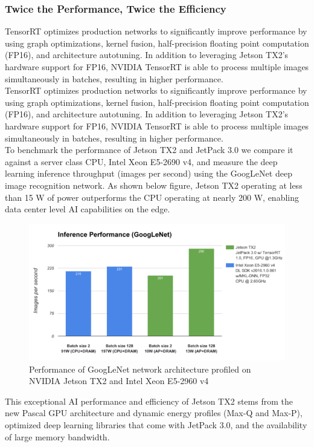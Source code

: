         \subsubsection{Twice the Performance, Twice the Efficiency}
            TensorRT optimizes production networks to significantly improve performance by using graph optimizations, kernel fusion, half-precision floating point computation (FP16), and architecture autotuning. In addition to leveraging Jetson TX2’s hardware support for FP16, 
            NVIDIA TensorRT is able to process multiple images simultaneously in batches, resulting in higher performance. \\ 
            \vspace{3mm}
            TensorRT optimizes production networks to significantly improve performance by using graph optimizations, kernel fusion, half-precision floating point computation (FP16), and architecture autotuning. In addition to leveraging Jetson TX2’s hardware support for FP16, 
            NVIDIA TensorRT is able to process multiple images simultaneously in batches, resulting in higher performance. \\ 
            \vspace{3mm}
            To benchmark the performance of Jetson TX2 and JetPack 3.0 we compare it against a server class CPU, Intel Xeon E5-2690 v4, and measure the deep learning inference throughput (images per second) using the GoogLeNet deep image recognition network. As shown below figure, 
            Jetson TX2 operating at less than 15 W of power outperforms the CPU operating at nearly 200 W, enabling data center level AI capabilities on the edge.
            \begin{figure}[H]
                \centering
                \includegraphics[width=0.6\linewidth]{img/google-net.png}
                \caption{Performance of GoogLeNet network architecture profiled on NVIDIA Jetson TX2 and Intel Xeon E5-2960 v4}
            \end{figure}
            This exceptional AI performance and efficiency of Jetson TX2 stems from the new Pascal GPU architecture and dynamic energy profiles (Max-Q and Max-P), optimized deep learning libraries that come with JetPack 3.0, and the availability of large memory bandwidth.
